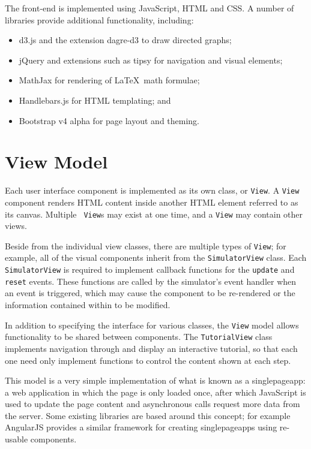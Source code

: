 \documentclass[bsc,twoside,singlespacing,parskip,logo,notimes,normalheadings]{infthesis}
\begin{document}
    The front-end is implemented using JavaScript, HTML and CSS. A
    number of libraries provide additional functionality, including:

    \begin{itemize}
    \item d3.js and the extension dagre-d3 to draw directed graphs;
    \item jQuery and extensions such as tipsy for navigation and
      visual elements;
    \item MathJax for rendering of \LaTeX\ math formulae;
    \item Handlebars.js for HTML templating; and
    \item Bootstrap v4 alpha for page layout and theming.
    \end{itemize}

    \section{View Model}
    
    Each user interface component is implemented as its own class, or
    {\tt View}. A {\tt View} component renders HTML content inside
    another HTML element referred to as its canvas. Multiple {\tt
      View}s may exist at one time, and a {\tt View} may contain other
    views. 

    Beside from the individual view classes, there are multiple types
    of {\tt View}; for example, all of the visual components inherit
    from the {\tt SimulatorView} class. Each {\tt SimulatorView} is
    required to implement callback functions for the {\tt update} and
    {\tt reset} events.  These functions are called by the simulator's
    event handler when an event is triggered, which may cause the
    component to be re-rendered or the information contained within to
    be modified.
    
    In addition to specifying the interface for various classes, the
    {\tt View} model allows functionality to be shared between
    components. The {\tt TutorialView} class implements navigation
    through and display an interactive tutorial, so that each one need
    only implement functions to control the content shown at each
    step.

    This model is a very simple implementation of what is known as a
    \gls{singlepageapp}: a web application in which the page is only
    loaded once, after which JavaScript is used to update the page
    content and asynchronous calls request more data from the
    server. Some existing libraries are based around this concept; for
    example AngularJS\cite{angularjs} provides a similar framework for
    creating \gls{singlepageapp}s using re-usable components.
    
\end{document}
